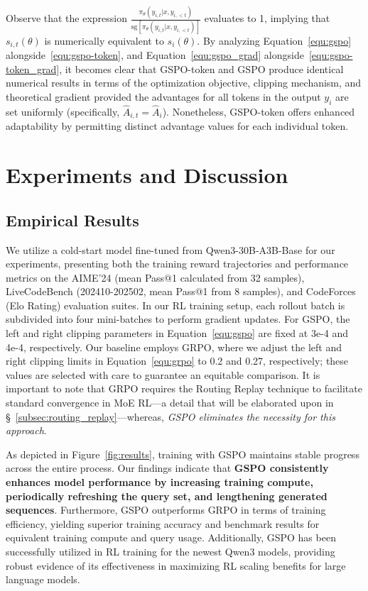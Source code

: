 Observe that the expression $\frac{ \pi_{\theta} (y_{i,t} | x, y_{i,<t}) }{ \mathrm{sg} \left[ \pi_{\theta} (y_{i,t} | x, y_{i,<t}) \right] }$ evaluates to 1, implying that $s_{i,t}(\theta)$ is numerically equivalent to $s_{i}(\theta)$. By analyzing Equation~\eqref{equ:gspo} alongside~\eqref{equ:gspo-token}, and Equation~\eqref{equ:gspo_grad} alongside~\eqref{equ:gspo-token_grad}, it becomes clear that GSPO-token and GSPO produce identical numerical results in terms of the optimization objective, clipping mechanism, and theoretical gradient provided the advantages for all tokens in the output $y_i$ are set uniformly (specifically, $\widehat{A}_{i,t} = \widehat{A}_{i}$). Nonetheless, GSPO-token offers enhanced adaptability by permitting distinct advantage values for each individual token.

\section{Experiments and Discussion}

\subsection{Empirical Results}

We utilize a cold-start model fine-tuned from Qwen3-30B-A3B-Base for our experiments, presenting both the training reward trajectories and performance metrics on the AIME'24 (mean Pass@1 calculated from 32 samples), LiveCodeBench (202410-202502, mean Pass@1 from 8 samples), and CodeForces (Elo Rating) evaluation suites. In our RL training setup, each rollout batch is subdivided into four mini-batches to perform gradient updates. For GSPO, the left and right clipping parameters in Equation~\eqref{equ:gspo} are fixed at 3e-4 and 4e-4, respectively. Our baseline employs GRPO, where we adjust the left and right clipping limits in Equation~\eqref{equ:grpo} to 0.2 and 0.27, respectively; these values are selected with care to guarantee an equitable comparison. It is important to note that GRPO requires the Routing Replay technique to facilitate standard convergence in MoE RL—a detail that will be elaborated upon in \S~\ref{subsec:routing_replay}—whereas, \textit{GSPO eliminates the necessity for this approach}.

As depicted in Figure~\ref{fig:results}, training with GSPO maintains stable progress across the entire process. Our findings indicate that \textbf{GSPO consistently enhances model performance by increasing training compute, periodically refreshing the query set, and lengthening generated sequences}. Furthermore, GSPO outperforms GRPO in terms of training efficiency, yielding superior training accuracy and benchmark results for equivalent training compute and query usage. Additionally, GSPO has been successfully utilized in RL training for the newest Qwen3 models, providing robust evidence of its effectiveness in maximizing RL scaling benefits for large language models.

